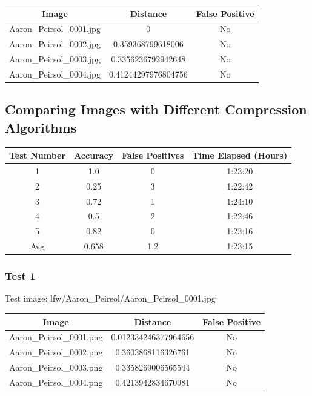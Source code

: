 \documentclass[12pt]{article}
\begin{document}
\begin{center}
\begin{tabular}{ccc}
Image & Distance & False Positive \\
\hline
Aaron\_Peirsol\_0001.jpg & 0 & No \\
Aaron\_Peirsol\_0002.jpg & 0.359368799618006 & No \\
Aaron\_Peirsol\_0003.jpg & 0.3356236792942648 & No \\
Aaron\_Peirsol\_0004.jpg & 0.41244297976804756 & No \\
\end{tabular}
\end{center}

\subsection{Comparing Images with Different Compression Algorithms}
\begin{center}
\begin{tabular}{cccc}
Test Number & Accuracy & False Positives & Time Elapsed (Hours) \\
\hline
1 & 1.0 & 0 & 1:23:20\\
2 & 0.25 & 3 & 1:22:42\\
3 & 0.72 & 1 & 1:24:10\\
4 & 0.5 & 2 & 1:22:46\\
5 & 0.82 & 0 & 1:23:16\\
Avg & 0.658 & 1.2 & 1:23:15 \\ 
\end{tabular}
\end{center}

\subsubsection{Test 1}
Test image: lfw/Aaron\_Peirsol/Aaron\_Peirsol\_0001.jpg

\begin{center}
\begin{tabular}{ccc}
Image & Distance & False Positive \\
\hline
Aaron\_Peirsol\_0001.png & 0.012334246377964656 & No \\
Aaron\_Peirsol\_0002.png & 0.3603868116326761 & No \\
Aaron\_Peirsol\_0003.png & 0.3358269006565544 & No \\
Aaron\_Peirsol\_0004.png & 0.4213942834670981 & No \\
\end{tabular}
\end{center}
\end{document}
